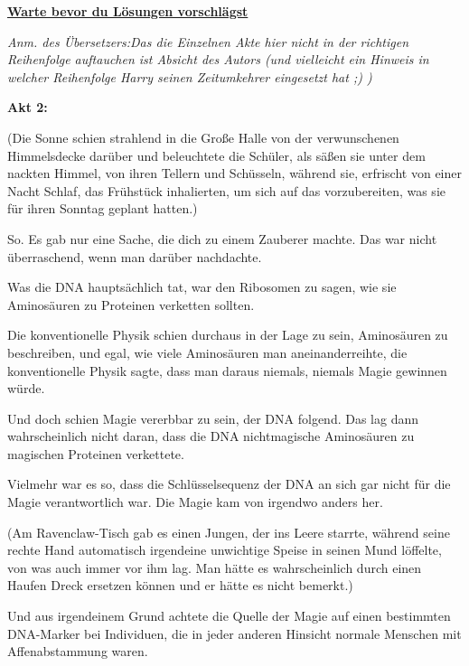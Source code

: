 

\hypertarget{warte-bevor-du-luxf6sungen-vorschluxe4gst}{%

\textbf{\uline{Warte bevor du Lösungen vorschlägst}}

\emph{Anm. des Übersetzers:Das die Einzelnen Akte hier nicht in der richtigen Reihenfolge auftauchen ist Absicht des Autors (und vielleicht ein Hinweis in welcher Reihenfolge Harry seinen Zeitumkehrer eingesetzt hat ;) )}

\textbf{Akt 2:}

(Die Sonne schien strahlend in die Große Halle von der verwunschenen Himmelsdecke darüber und beleuchtete die Schüler, als säßen sie unter dem nackten Himmel, von ihren Tellern und Schüsseln, während sie, erfrischt von einer Nacht Schlaf, das Frühstück inhalierten, um sich auf das vorzubereiten, was sie für ihren Sonntag geplant hatten.)

So. Es gab nur eine Sache, die dich zu einem Zauberer machte. Das war nicht überraschend, wenn man darüber nachdachte.

Was die DNA hauptsächlich tat, war den Ribosomen zu sagen, wie sie Aminosäuren zu Proteinen verketten sollten.

Die konventionelle Physik schien durchaus in der Lage zu sein, Aminosäuren zu beschreiben, und egal, wie viele Aminosäuren man aneinanderreihte, die konventionelle Physik sagte, dass man daraus niemals, niemals Magie gewinnen würde.

Und doch schien Magie vererbbar zu sein, der DNA folgend. Das lag dann wahrscheinlich nicht daran, dass die DNA nichtmagische Aminosäuren zu magischen Proteinen verkettete.

Vielmehr war es so, dass die Schlüsselsequenz der DNA an sich gar nicht für die Magie verantwortlich war. Die Magie kam von irgendwo anders her.

(Am Ravenclaw-Tisch gab es einen Jungen, der ins Leere starrte, während seine rechte Hand automatisch irgendeine unwichtige Speise in seinen Mund löffelte, von was auch immer vor ihm lag. Man hätte es wahrscheinlich durch einen Haufen Dreck ersetzen können und er hätte es nicht bemerkt.)

Und aus irgendeinem Grund achtete die Quelle der Magie auf einen bestimmten DNA-Marker bei Individuen, die in jeder anderen Hinsicht normale Menschen mit Affenabstammung waren.

}
